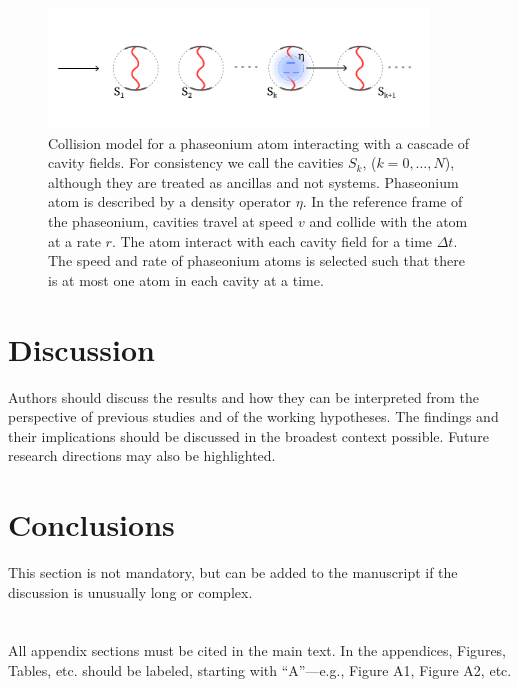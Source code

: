 \documentclass[]{article}
\begin{document}
\begin{figure}
\includegraphics[width=0.9\textwidth]{images/phaseonium2_horizontal.pdf}
\caption{ Collision model for a phaseonium atom interacting with a cascade of cavity fields. For consistency we call the cavities $S_k$, ($k=0,\ldots, N$), although they are treated as ancillas and not systems. Phaseonium atom is described by a density operator $\eta$. In the reference frame of the phaseonium, cavities travel at speed $v$ and collide with the atom at a rate $r$. The atom interact with each cavity field for a time $\Delta t$. The speed and rate of phaseonium atoms is selected such that there is at most one atom in each cavity at a time.}
\label{fig:phaseonium-collisional}
\end{figure}



 



\section{Discussion}

Authors should discuss the results and how they can be interpreted from the perspective of previous studies and of the working hypotheses. The findings and their implications should be discussed in the broadest context possible. Future research directions may also be highlighted.

\section{Conclusions}

This section is not mandatory, but can be added to the manuscript if the discussion is unusually long or complex.


\vspace{6pt} 


\section[\appendixname~\thesection]{}
All appendix sections must be cited in the main text. In the appendices, Figures, Tables, etc. should be labeled, starting with ``A''---e.g., Figure A1, Figure A2, etc.




\end{document}
